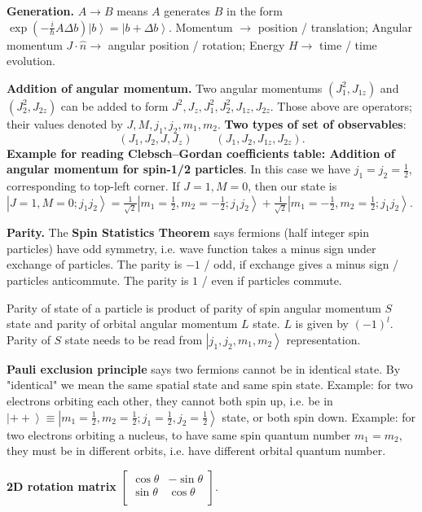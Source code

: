 \textbf{Generation.} $A \to B$ means $A$ generates $B$ in the form $\exp\left( - \frac{i}{\hbar} A \Delta b \right) \left| b \right\rangle  = \left| b + \Delta b \right\rangle $. Momentum $\to $ position / translation; Angular momentum $J \cdot \hat{n}  \to $ angular position / rotation; Energy $ H \to $ time / time evolution.

\textbf{Addition of angular momentum.} Two angular momentums $(J_1^2, J_{1z})$ and $\left( J_2^2, J_{2 z} \right) $ can be added to form $J^2, J_z, J_1^2, J_2^2, J_{1z}, J_{2z}$. Those above are operators; their values denoted by $J, M, j_1, j_2, m_1, m_2$. \textbf{Two types of set of observables}: \[
	(J_1, J_2, J, J_z) \qquad (J_1, J_2, J_{1z}, J_{2z})
.\] 
\textbf{Example for reading Clebsch–Gordan coefficients table: Addition of angular momentum for spin-1/2 particles}. 
In this case we have $j_1 = j_2 = \frac{1}{2}$, corresponding to top-left corner. If $J = 1, M = 0$, then our state is  $\left| J=1, M = 0; j_1 j_2 \right\rangle  =  \frac{1}{\sqrt{2} }\left| m_1=\frac{1}{2}, m_2 = -\frac{1}{2}; j_1 j_2 \right\rangle  + \frac{1}{\sqrt{2} }\left| m_1 = -\frac{1}{2}, m_2 = \frac{1}{2}; j_1 j_2 \right\rangle .$

\textbf{Parity.} The \textbf{Spin Statistics Theorem} says fermions  (half integer spin particles) have odd symmetry, i.e. wave function takes a minus sign under exchange of particles. The parity is $-1$ / odd, if exchange gives a minus sign / particles anticommute. The parity is $1$ / even if particles commute.

Parity of state of a particle is product of parity of spin angular momentum $S$ state and parity of orbital angular momentum $L$ state.  $L$ is given by $(-1)^l$. Parity of $S$ state needs to be read from $\left| j_1, j_2, m_1, m_2 \right\rangle $ representation.



\textbf{Pauli exclusion principle} says two fermions cannot be in identical state. By "identical" we mean the same spatial state and same spin state. Example: for two electrons orbiting each other, they cannot both spin up, i.e. be in $\left| ++ \right\rangle  \equiv \left| m_1 = \frac{1}{2}, m_2 = \frac{1}{2}; j_1 = \frac{1}{2}, j_2 = \frac{1}{2} \right\rangle $ state, or both spin down. Example: for two electrons orbiting a nucleus, to have same spin quantum number $m_1 = m_2$, they must be in different orbits, i.e. have different orbital quantum number.

\textbf{2D rotation matrix} $\begin{bmatrix}
		\cos \theta & - \sin \theta \\
		\sin \theta &  \cos \theta \\
	\end{bmatrix}
.$ 

